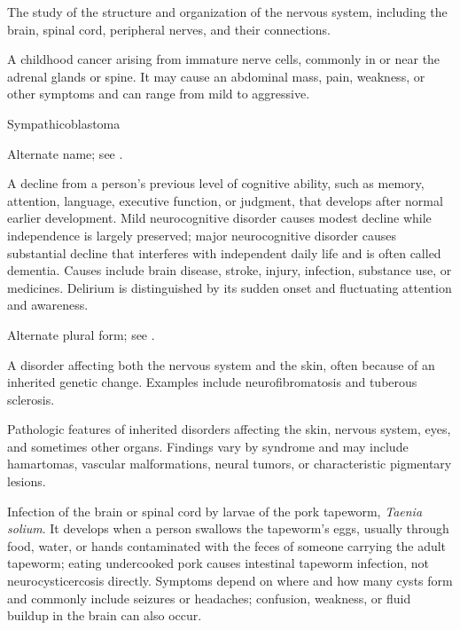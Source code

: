  The study of the structure and organization of the nervous system, including the brain, spinal cord, peripheral nerves, and their connections.

 A childhood cancer arising from immature nerve cells, commonly in or near the adrenal glands or spine. It may cause an abdominal mass, pain, weakness, or other symptoms and can range from mild to aggressive.

\synonyms
Sympathicoblastoma

 Alternate name; see .

 A decline from a person’s previous level of cognitive ability, such as memory, attention, language, executive function, or judgment, that develops after normal earlier development. Mild neurocognitive disorder causes modest decline while independence is largely preserved; major neurocognitive disorder causes substantial decline that interferes with independent daily life and is often called dementia. Causes include brain disease, stroke, injury, infection, substance use, or medicines. Delirium is distinguished by its sudden onset and fluctuating attention and awareness.

 Alternate plural form; see .

 A disorder affecting both the nervous system and the skin, often because of an inherited genetic change. Examples include neurofibromatosis and tuberous sclerosis.

 Pathologic features of inherited disorders affecting the skin, nervous system, eyes, and sometimes other organs. Findings vary by syndrome and may include hamartomas, vascular malformations, neural tumors, or characteristic pigmentary lesions.

 Infection of the brain or spinal cord by larvae of the pork tapeworm, \textit{Taenia solium}. It develops when a person swallows the tapeworm's eggs, usually through food, water, or hands contaminated with the feces of someone carrying the adult tapeworm; eating undercooked pork causes intestinal tapeworm infection, not neurocysticercosis directly. Symptoms depend on where and how many cysts form and commonly include seizures or headaches; confusion, weakness, or fluid buildup in the brain can also occur.

